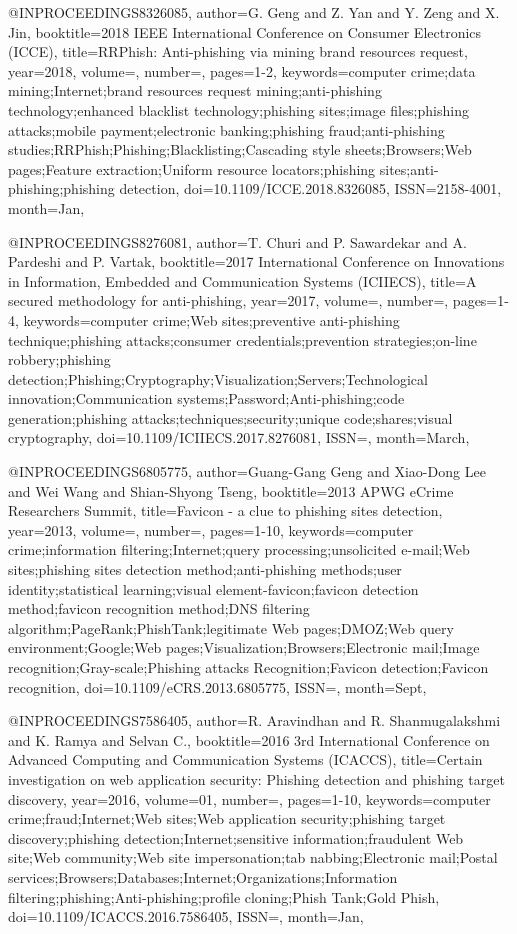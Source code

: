 @INPROCEEDINGS{8326085,
author={G. Geng and Z. Yan and Y. Zeng and X. Jin},
booktitle={2018 IEEE International Conference on Consumer Electronics (ICCE)},
title={RRPhish: Anti-phishing via mining brand resources request},
year={2018},
volume={},
number={},
pages={1-2},
keywords={computer crime;data mining;Internet;brand resources request mining;anti-phishing technology;enhanced blacklist technology;phishing sites;image files;phishing attacks;mobile payment;electronic banking;phishing fraud;anti-phishing studies;RRPhish;Phishing;Blacklisting;Cascading style sheets;Browsers;Web pages;Feature extraction;Uniform resource locators;phishing sites;anti-phishing;phishing detection},
doi={10.1109/ICCE.2018.8326085},
ISSN={2158-4001},
month={Jan},}

@INPROCEEDINGS{8276081,
author={T. Churi and P. Sawardekar and A. Pardeshi and P. Vartak},
booktitle={2017 International Conference on Innovations in Information, Embedded and Communication Systems (ICIIECS)},
title={A secured methodology for anti-phishing},
year={2017},
volume={},
number={},
pages={1-4},
keywords={computer crime;Web sites;preventive anti-phishing technique;phishing attacks;consumer credentials;prevention strategies;on-line robbery;phishing detection;Phishing;Cryptography;Visualization;Servers;Technological innovation;Communication systems;Password;Anti-phishing;code generation;phishing attacks;techniques;security;unique code;shares;visual cryptography},
doi={10.1109/ICIIECS.2017.8276081},
ISSN={},
month={March},}

@INPROCEEDINGS{6805775,
author={Guang-Gang Geng and Xiao-Dong Lee and Wei Wang and Shian-Shyong Tseng},
booktitle={2013 APWG eCrime Researchers Summit},
title={Favicon - a clue to phishing sites detection},
year={2013},
volume={},
number={},
pages={1-10},
keywords={computer crime;information filtering;Internet;query processing;unsolicited e-mail;Web sites;phishing sites detection method;anti-phishing methods;user identity;statistical learning;visual element-favicon;favicon detection method;favicon recognition method;DNS filtering algorithm;PageRank;PhishTank;legitimate Web pages;DMOZ;Web query environment;Google;Web pages;Visualization;Browsers;Electronic mail;Image recognition;Gray-scale;Phishing attacks Recognition;Favicon detection;Favicon recognition},
doi={10.1109/eCRS.2013.6805775},
ISSN={},
month={Sept},}

@INPROCEEDINGS{7586405,
author={R. Aravindhan and R. Shanmugalakshmi and K. Ramya and Selvan C.},
booktitle={2016 3rd International Conference on Advanced Computing and Communication Systems (ICACCS)},
title={Certain investigation on web application security: Phishing detection and phishing target discovery},
year={2016},
volume={01},
number={},
pages={1-10},
keywords={computer crime;fraud;Internet;Web sites;Web application security;phishing target discovery;phishing detection;Internet;sensitive information;fraudulent Web site;Web community;Web site impersonation;tab nabbing;Electronic mail;Postal services;Browsers;Databases;Internet;Organizations;Information filtering;phishing;Anti-phishing;profile cloning;Phish Tank;Gold Phish},
doi={10.1109/ICACCS.2016.7586405},
ISSN={},
month={Jan},}

